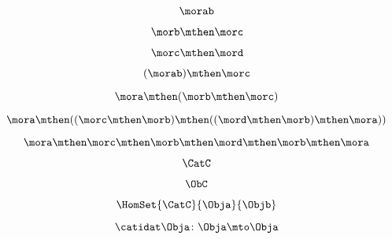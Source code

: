 \begin{forslides}
        \begin{equation}
            \label{eq:semicats-slides-08}
            \morab
        \end{equation}

        \begin{equation}
            \label{eq:semicats-slides-09}
            \morb \mthen \morc
        \end{equation}

        \begin{equation}
            \label{eq:10}
            \morc \mthen \mord
        \end{equation}

        \begin{equation}
            \label{eq:semicats-slides-11}
            (\morab) \mthen \morc
        \end{equation}

        \begin{equation}
            \label{eq:semicats-slides-12}
            \mora \mthen  (\morb \mthen \morc )
        \end{equation}

        \begin{equation}
            \label{eq:semicats-slides-13}
            \mora \mthen  ((\morc \mthen \morb ) \mthen (( \mord \mthen \morb ) \mthen \mora ))
        \end{equation}

        \begin{equation}
            \label{eq:semicats-slides-14}
            \mora \mthen  \morc \mthen \morb  \mthen \mord \mthen \morb  \mthen \mora
        \end{equation}
        
        \begin{equation}
            \label{eq:semicats-slides-15}
            \CatC
        \end{equation}

        \begin{equation}
            \label{eq:semicats-slides-16}
            \ObC
        \end{equation}

        \begin{equation}
            \label{eq:semicats-slides-17}
            \HomSet{\CatC}{\Obja}{\Objb}
        \end{equation}

        \begin{equation}
            \label{eq:semicats-slides-18}
            \catidat\Obja\colon \Obja \mto \Obja
        \end{equation}


\end{forslides}
